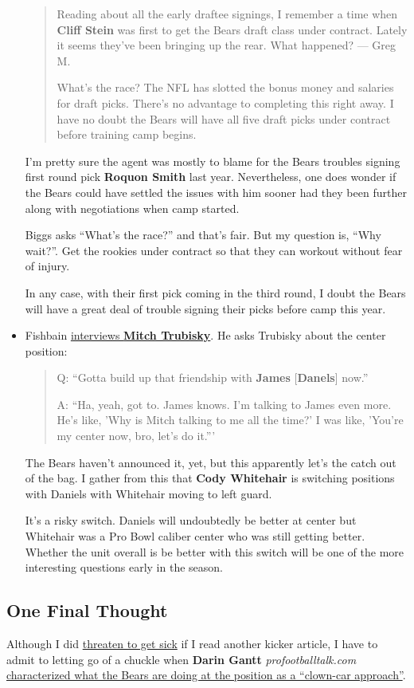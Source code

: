 \documentclass[11pt]{article}
\begin{document}
\begin{itemize}
\begin{quote}
Reading about all the early draftee signings, I remember a time when \textbf{Cliff Stein} was first to get the Bears draft class under contract. Lately it seems they’ve been bringing up the rear. What happened? — Greg M.

What’s the race? The NFL has slotted the bonus money and salaries for draft picks. There’s no advantage to completing this right away. I have no doubt the Bears will have all five draft picks under contract before training camp begins.
\end{quote}

I'm pretty sure the agent was mostly to blame for the Bears troubles signing first round pick \textbf{Roquon Smith} last year.  Nevertheless, one does wonder if the Bears could have settled the issues with him sooner had they been further along with negotiations when camp started.

Biggs asks ``What's the race?'' and that's fair.  But my question is, ``Why wait?''.  Get the rookies under contract so that they can workout without fear of injury.

In any case, with their first pick coming in the third round, I doubt the Bears will have a great deal of trouble signing their picks before camp this year.
\item Fishbain \href{https://theathletic.com/962002/2019/05/04/year-3-your-comfort-level-with-everything-just-goes-up-qa-with-bears-quarterback-mitch-trubisky/}{interviews \textbf{Mitch Trubisky}}.  He asks Trubisky about the center position:

\begin{quote}
Q: ``Gotta build up that friendship with \textbf{James} [\textbf{Danels}] now.''

A: ``Ha, yeah, got to. James knows. I’m talking to James even more. He’s like, 'Why is Mitch talking to me all the time?' I was like, 'You’re my center now, bro, let’s do it.'''
\end{quote}

The Bears haven't announced it, yet, but this apparently let's the catch out of the bag.  I gather from this that \textbf{Cody Whitehair} is switching positions with Daniels with Whitehair moving to left guard.

It's a risky switch.  Daniels will undoubtedly be better at center but Whitehair was a Pro Bowl caliber center who was still getting better.  Whether the unit overall is be better with this switch will be one of the more interesting questions early in the season.
\end{itemize}

\subsection{One Final Thought}
Although I did \href{http://bearingthenews.com/blog/2019/05/02/should-the-nfl-add-another-round-to-the-draft-and-other-points-of-view/}{threaten to get sick} if I read another kicker article, I have to admit to letting go of a chuckle when \textbf{Darin Gantt} \textit{profootballtalk.com} \href{https://profootballtalk.nbcsports.com/2019/05/03/bears-bringing-eight-kickers-to-rookie-minicamp/}{characterized what the Bears are doing at the position as a ``clown-car approach''}.
\end{document}
